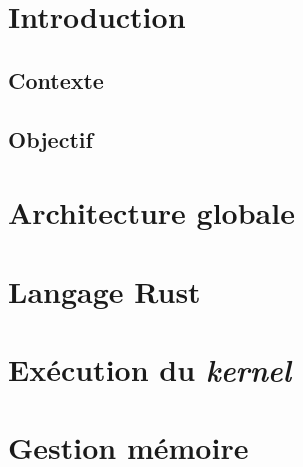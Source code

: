 \documentclass[a4paper, 12pt]{article}
\begin{document}

\section{Introduction}
\subsection{Contexte}


\subsection{Objectif}

\newpage

\section{Architecture globale}


\newpage

\section{Langage Rust}

\newpage

\section{Exécution du \textit{kernel}}


\newpage

\section{Gestion mémoire}

\end{document}
